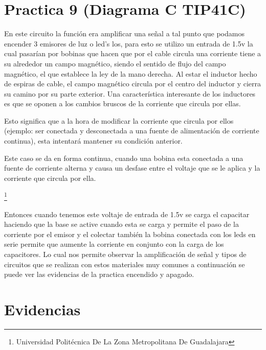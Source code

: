 \documentclass[11pt,a4paper]{article}
\begin{document}
\section{Practica 9 (Diagrama C TIP41C)}

En este circuito la función era amplificar una señal a tal punto que podamos encender 3 emisores de luz o led's los, para esto se utilizo un entrada de 1.5v la cual pasarían por bobinas que hacen que por el cable circula una corriente tiene a su alrededor un campo magnético, siendo el sentido de flujo del campo magnético, el que establece la ley de la mano derecha.
Al estar el inductor hecho de espiras de cable, el campo magnético circula por el centro del inductor y cierra su camino por su parte exterior. Una característica interesante de los inductores es que se oponen a los cambios bruscos de la corriente que circula por ellas.

Esto significa que a la hora de modificar la corriente que circula por ellos (ejemplo: ser conectada y desconectada a una fuente de alimentación de corriente continua), esta intentará mantener su condición anterior.

Este caso se da en forma continua, cuando una bobina esta conectada a una fuente de corriente alterna y causa un desfase entre el voltaje que se le aplica y la corriente que circula por ella. 

\footnote{Universidad Politécnica De La Zona Metropolitana De Guadalajara} 

\newpage

Entonces cuando tenemos este voltaje de entrada de 1.5v se carga el capacitar haciendo que la base se active cuando esta se carga y permite el paso de la corriente por el emisor y el colectar también la bobina conectada con los leds en serie permite que aumente la corriente en conjunto con la carga de los capacitores. Lo cual nos permite observar la amplificación de señal y tipos de circuitos que se realizan con estos materiales muy comunes a continuación se puede ver las evidencias de la practica encendido y apagado.

\section{Evidencias}
\end{document}
